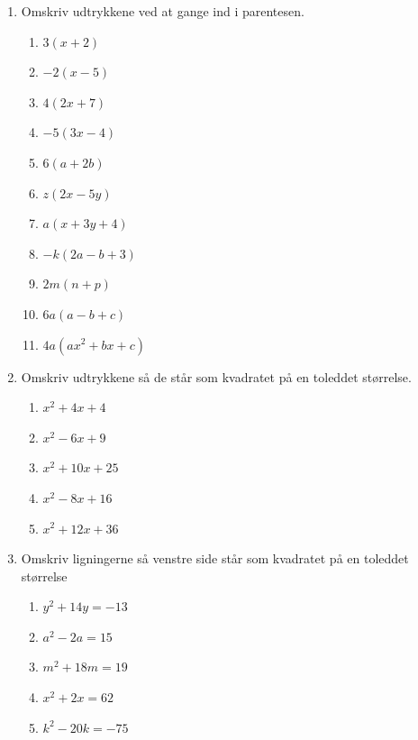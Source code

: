 \documentclass[10pt,a4paper,table]{article}
\begin{document}
\vspace{4em}
\begin{enumerate}[label=\arabic*.]
\item Omskriv udtrykkene ved at gange ind i parentesen.
\begin{enumerate}[label=\alph*)]

\item \(3(x+2)\)

\item \(-2(x-5)\)

\item \(4(2x+7)\)

\item \(-5(3x-4)\)

\item \(6(a+2b)\)

\item \(z(2x-5y)\)

\item \(a(x+3y+4)\)

\item \(-k(2a-b+3)\)

\item \(2m(n+p)\)

\item \(6a(a-b+c)\)

\item \(4a(ax^2+bx+c)\)

\end{enumerate}

\item Omskriv udtrykkene så de står som kvadratet på en toleddet størrelse.

\begin{enumerate}[label=\alph*)]

\item \(x^2 + 4x + 4\)

\item \(x^2 - 6x + 9\)

\item \(x^2 + 10x + 25\)

\item \(x^2 - 8x + 16\)

\item \(x^2 + 12x + 36\)

\end{enumerate}

\item Omskriv ligningerne så venstre side står som kvadratet på en toleddet størrelse

\begin{enumerate}[label=\alph*)]

\item \(y^2 + 14y = -13\)

\item \(a^2 - 2a = 15\)

\item \(m^2 + 18m = 19\)

\item \(x^2 + 2x = 62\)

\item \(k^2 - 20k = -75\)

\end{enumerate}
\end{enumerate}
\end{document}
